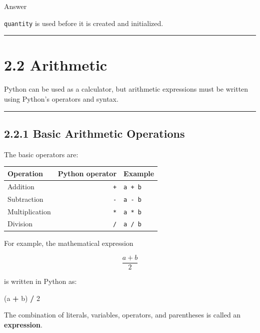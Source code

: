 \documentclass[
]{article}
\newenvironment{Shaded}{\begin{snugshade}}{\end{snugshade}}
\newcommand{\DecValTok}[1]{\textcolor[rgb]{0.00,0.00,0.81}{#1}}
\newcommand{\NormalTok}[1]{#1}
\newcommand{\OperatorTok}[1]{\textcolor[rgb]{0.81,0.36,0.00}{\textbf{#1}}}
\newcounter{none} %
\begin{document}
Answer

\texttt{quantity} is used before it is created and initialized.

\begin{center}\rule{0.5\linewidth}{0.5pt}\end{center}

\section{2.2 Arithmetic}\label{arithmetic}

Python can be used as a calculator, but arithmetic expressions must be
written using Python's operators and syntax.

\begin{center}\rule{0.5\linewidth}{0.5pt}\end{center}

\subsection{2.2.1 Basic Arithmetic
Operations}\label{basic-arithmetic-operations}

The basic operators are:

{\def\LTcaptype{none} %
\begin{longtable}[]{@{}lrl@{}}
\toprule\noalign{}
Operation & Python operator & Example \\
\midrule\noalign{}
\endhead
\bottomrule\noalign{}
\endlastfoot
Addition & \texttt{+} & \texttt{a\ +\ b} \\
Subtraction & \texttt{-} & \texttt{a\ -\ b} \\
Multiplication & \texttt{*} & \texttt{a\ *\ b} \\
Division & \texttt{/} & \texttt{a\ /\ b} \\
\end{longtable}
}

For example, the mathematical expression

\[
\frac{a+b}{2}
\]

is written in Python as:

\begin{Shaded}
\begin{Highlighting}[]
\NormalTok{(a }\OperatorTok{+}\NormalTok{ b) }\OperatorTok{/} \DecValTok{2}
\end{Highlighting}
\end{Shaded}

The combination of literals, variables, operators, and parentheses is
called an \textbf{expression}.
\end{document}

